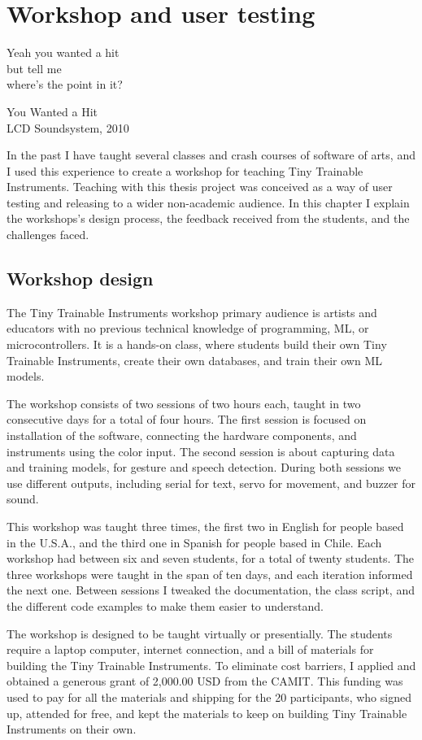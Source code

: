 \chapter{Workshop and user testing}

\epigraph{Yeah you wanted a hit \\ but tell me \\ where's the point in it?}{You Wanted a Hit \\ LCD Soundsystem, 2010}

In the past I have taught several classes and crash courses of software of arts, and I used this experience to create a workshop for teaching Tiny Trainable Instruments. Teaching with this thesis project was conceived as a way of user testing and releasing to a wider non-academic audience. In this chapter I explain the workshops's design process, the feedback received from the students, and the challenges faced.

\section{Workshop design}

The Tiny Trainable Instruments workshop primary audience is artists and educators with no previous technical knowledge of programming, \acrshort{ML}, or microcontrollers. It is a hands-on class, where students build their own Tiny Trainable Instruments, create their own databases, and train their own \acrshort{ML} models.

The workshop consists of two sessions of two hours each, taught in two consecutive days for a total of four hours. The first session is focused on installation of the software, connecting the hardware components, and instruments using the color input. The second session is about capturing data and training models, for gesture and speech detection. During both sessions we use different outputs, including serial for text, servo for movement, and buzzer for sound.

This workshop was taught three times, the first two in English for people based in the U.S.A., and the third one in Spanish for people based in Chile. Each workshop had between six and seven students, for a total of twenty students. The three workshops were taught in the span of ten days, and each iteration informed the next one. Between sessions I tweaked the documentation, the class script, and the different code examples to make them easier to understand.

The workshop is designed to be taught virtually or presentially. The students require a laptop computer, internet connection, and a bill of materials for building the Tiny Trainable Instruments. To eliminate cost barriers, I applied and obtained a generous grant of 2,000.00 USD from the \acrlong{CAMIT}. This funding was used to pay for all the materials and shipping for the 20 participants, who signed up, attended for free, and kept the materials to keep on building Tiny Trainable Instruments on their own.

